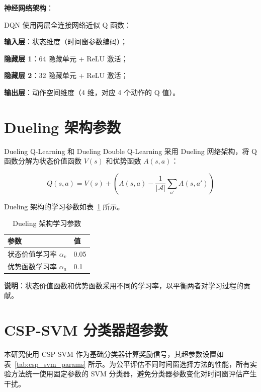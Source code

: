 \noindent\textbf{神经网络架构}：

DQN 使用两层全连接网络近似 Q 函数：

\textbf{输入层}：状态维度（时间窗参数编码）；

\textbf{隐藏层 1}：64 隐藏单元 + ReLU 激活；

\textbf{隐藏层 2}：32 隐藏单元 + ReLU 激活；

\textbf{输出层}：动作空间维度（4 维，对应 4 个动作的 Q 值）。

\section{Dueling 架构参数}
\label{sec:dueling_params}

Dueling Q-Learning 和 Dueling Double Q-Learning 采用 Dueling 网络架构，将 Q 函数分解为状态价值函数 $V(s)$ 和优势函数 $A(s,a)$：

\begin{equation}
Q(s, a) = V(s) + \left( A(s, a) - \frac{1}{|\mathcal{A}|} \sum_{a'} A(s, a') \right)
\end{equation}

Dueling 架构的学习参数如表~\ref{tab:dueling_params} 所示。

\begin{table}[H]
\centering
\caption{Dueling 架构学习参数}
\label{tab:dueling_params}
\begin{tabular}{ll}
\hline
\textbf{参数} & \textbf{值} \\
\hline
状态价值学习率 $\alpha_v$ & 0.05 \\
优势函数学习率 $\alpha_a$ & 0.1 \\
\hline
\end{tabular}
\end{table}

\noindent\textbf{说明}：状态价值函数和优势函数采用不同的学习率，以平衡两者对学习过程的贡献。

\section{CSP-SVM 分类器超参数}
\label{sec:csp_svm_params}

本研究使用 CSP-SVM 作为基础分类器计算奖励信号，其超参数设置如表~\ref{tab:csp_svm_params} 所示。为公平评估不同时间窗选择方法的性能，所有实验方法统一使用固定参数的 SVM 分类器，避免分类器参数变化对时间窗评估产生干扰。

